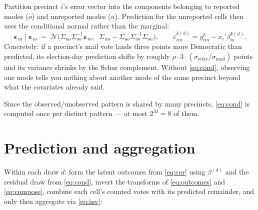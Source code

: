 \documentclass[11pt]{article}
\newcommand{\Norm}{\mathcal{N}}
\begin{document}
Partition precinct $i$'s error vector into the components belonging to reported modes
($o$) and unreported modes ($u$). Prediction for the unreported cells then uses the
conditional normal rather than the marginal:
\begin{equation}
  \boldsymbol\varepsilon_{iu} \mid \boldsymbol\varepsilon_{io}
  \;\sim\;
  \Norm\!\Big(
    \Sigma_{uo}\Sigma_{oo}^{-1} \boldsymbol\varepsilon_{io},\;\;
    \Sigma_{uu} - \Sigma_{uo}\Sigma_{oo}^{-1}\Sigma_{ou}
  \Big),
  \qquad
  \varepsilon^{k(d)}_{im} = y^{k}_{im} - x_i'\beta^{k(d)}_{m}.
  \label{eq:cond}
\end{equation}
Concretely: if a precinct's mail vote lands three points more Democratic than predicted,
its election-day prediction shifts by roughly $\rho\cdot 3 \cdot
(\sigma_{\textrm{eday}}/\sigma_{\textrm{mail}})$ points and its variance shrinks by the
Schur complement. Without \eqref{eq:cond}, observing one mode tells you nothing about
another mode of the same precinct beyond what the covariates already said.

Since the observed/unobserved pattern is shared by many precincts, \eqref{eq:cond} is
computed once per distinct pattern --- at most $2^M = 8$ of them.

\section{Prediction and aggregation}\label{sec:agg}

Within each draw $d$: form the latent outcomes from \eqref{eq:sur} using $\beta^{(d)}$ and
the residual draw from \eqref{eq:cond}, invert the transforms of \eqref{eq:outcomes} and
\eqref{eq:compose}, combine each cell's counted votes with its predicted remainder, and
only then aggregate via \eqref{eq:inv}:
\end{document}
